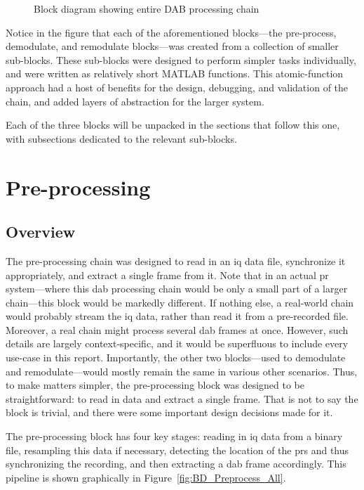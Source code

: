\documentclass[class=report,11pt,crop=false]{standalone}
\begin{document}
\begin{figure}[htbp]
  \centering
  \captionsetup{type=figure}
  \def\svgwidth{\linewidth}
  { %
      }
  \caption{Block diagram showing entire DAB processing chain}
  \label{fig:BD_Overview_All}
\end{figure}

Notice in the figure that each of the aforementioned blocks---the pre-process, demodulate, and remodulate blocks---was created from a collection of smaller sub-blocks. These sub-blocks were designed to perform simpler tasks individually, and were written as relatively short MATLAB functions. This atomic-function approach had a host of benefits for the design, debugging, and validation of the chain, and added layers of abstraction for the larger system.

Each of the three blocks will be unpacked in the sections that follow this one, with subsections dedicated to the relevant sub-blocks.

\section{Pre-processing \label{sect:dab-proc_preprocessing}}
\subsection{Overview}
The pre-processing chain was designed to read in an \gls{iq} data file, synchronize it appropriately, and extract a single frame from it. Note that in an actual \gls{pr} system---where this \gls{dab} processing chain would be only a small part of a larger chain---this block would be markedly different. If nothing else, a real-world chain would probably stream the \gls{iq} data, rather than read it from a pre-recorded file. Moreover, a real chain might process several \gls{dab} frames at once. However, such details are largely context-specific, and it would be superfluous to include every use-case in this report. Importantly, the other two blocks---used to demodulate and remodulate---would mostly remain the same in various other scenarios. Thus, to make matters simpler, the pre-processing block was designed to be straightforward: to read in data and extract a single frame. That is not to say the block is trivial, and there were some important design decisions made for it.

The pre-processing block has four key stages: reading in \gls{iq} data from a binary file, resampling this data if necessary, detecting the location of the \gls{prs} and thus synchronizing the recording, and then extracting a \gls{dab} frame accordingly. This pipeline is shown graphically in Figure~\ref{fig:BD_Preprocess_All}.
\end{document}
